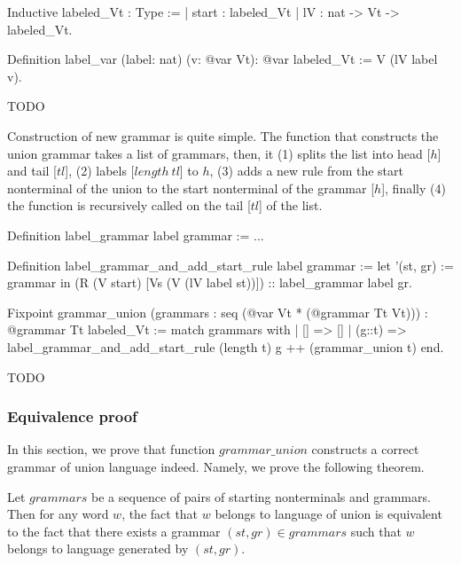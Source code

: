 \begin{listing}[h]
    \begin{pyglist}[language=coq, numbers=none, numbersep=5pt]
  Inductive labeled_Vt : Type :=
  | start : labeled_Vt
  | lV : nat -> Vt -> labeled_Vt.
  
  Definition label_var (label: nat) 
                       (v: @var Vt): @var 
                       labeled_Vt :=
    V (lV label v).  
    \end{pyglist}
    \caption{TODO}
    \label{lst:verbments1}
\end{listing}

Construction of new grammar is quite simple. The function that constructs the union grammar takes a list of grammars, then, it (1) splits the list into head [$h$] and tail [$tl$], (2) labels [$length \ tl$] to $h$, (3) adds a new rule from the start nonterminal of the union to the start nonterminal of the grammar [$h$], finally (4) the function is recursively called on the tail [$tl$] of the list.

\begin{listing}[h]
    \begin{pyglist}[language=coq, numbers=none, numbersep=5pt]
  Definition label_grammar label grammar := ...

  Definition label_grammar_and_add_start_rule 
               label 
               grammar :=
    let '(st, gr) := grammar in 
    (R (V start) [Vs (V (lV label st))]) 
       :: label_grammar label gr.        

  Fixpoint grammar_union 
     (grammars : seq (@var Vt * (@grammar Tt Vt)))
       : @grammar 
     Tt 
     labeled_Vt :=
    match grammars with
    |  [] => []
    |  (g::t) => 
         label_grammar_and_add_start_rule 
           (length t) 
           g ++ (grammar_union t)
    end.
    \end{pyglist}
    \caption{TODO}
    \label{lst:verbments1}
\end{listing}

\subsubsection{Equivalence proof}

In this section, we prove that function $grammar\_union$ constructs a correct grammar of union language indeed. Namely, we prove the following theorem.

\begin{theorem}\label{theorem-correct-union}
    Let $grammars$ be a sequence of pairs of starting nonterminals and grammars. Then for any word $w$, the fact that $w$ belongs to language of union is equivalent to the fact that there exists a grammar $(st,gr) \in grammars$ such that $w$ belongs to language generated by $(st,gr)$.
\end{theorem}

